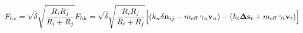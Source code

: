 \documentclass[12pt]{article}
\begin{document}
$$
   F_{hz} = \sqrt{\delta} \sqrt{\frac{R_i R_j}{R_i + R_j}} F_{hk} = 
     \sqrt{\delta} \sqrt{\frac{R_i R_j}{R_i + R_j}} 
     \Big[ (k_n \delta \mathbf{n}_{ij} -  
       m_{\mbox{\scriptsize{eff}}} \: \gamma_n \mathbf{ v}_n) -
       (k_t \mathbf{ \Delta s}_t +
       m_{\mbox{\scriptsize{eff}}} \: \gamma_t \mathbf{v}_t) \Big]
$$
\end{document}
